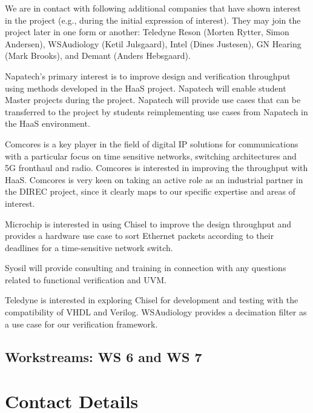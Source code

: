 \documentclass[fleqn,12pt]{article}
\begin{document}
We are in contact with following additional companies that have shown interest in
the project (e.g., during the initial expression of interest).
They may join the project later in one form or another:
Teledyne Reson (Morten Rytter, Simon Andersen), WSAudiology (Ketil Julsgaard),
Intel (Dines Justesen), GN Hearing (Mark Brooks), and Demant (Anders Hebsgaard).

Napatech's primary interest is to improve design and  verification throughput using methods developed in the HaaS project.
Napatech will enable student Master projects during the project.
Napatech will provide use cases that can be transferred to the project by students reimplementing use cases from Napatech in the HaaS environment.

Comcores is a key player in the field of digital IP solutions for communications with a particular focus on time sensitive networks, switching architectures and 5G fronthaul and radio.
Comcores is interested in improving the throughput with HaaS.
Comcores is very keen on taking an active role as an industrial partner in the DIREC project, since it clearly maps to our specific expertise and areas of interest.

Microchip is interested in using Chisel to improve the design throughput and
provides a hardware use case to sort Ethernet packets according to their deadlines
for a time-sensitive network switch.

Syosil will provide consulting and training in connection with any questions related
to functional verification and UVM.

Teledyne is interested in exploring Chisel for development and testing with the compatibility of VHDL and Verilog.
%
WSAudiology provides a decimation filter as a use case for our verification framework.
%


%


\subsection*{Workstreams: WS 6 and WS 7}


\section*{Contact Details}
\end{document}
